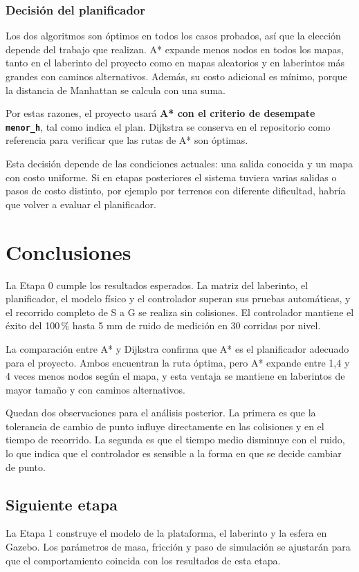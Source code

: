 \documentclass[11pt,a4paper]{article}
\begin{document}
\subsubsection*{Decisión del planificador}
Los dos algoritmos son óptimos en todos los casos probados, así que la elección depende del trabajo que realizan. A* expande menos nodos en todos los mapas, tanto en el laberinto del proyecto como en mapas aleatorios y en laberintos más grandes con caminos alternativos. Además, su costo adicional es mínimo, porque la distancia de Manhattan se calcula con una suma.

Por estas razones, el proyecto usará \textbf{A* con el criterio de desempate \texttt{menor\_h}}, tal como indica el plan. Dijkstra se conserva en el repositorio como referencia para verificar que las rutas de A* son óptimas.

Esta decisión depende de las condiciones actuales: una salida conocida y un mapa con costo uniforme. Si en etapas posteriores el sistema tuviera varias salidas o pasos de costo distinto, por ejemplo por terrenos con diferente dificultad, habría que volver a evaluar el planificador.

\section{Conclusiones}
La Etapa 0 cumple los resultados esperados. La matriz del laberinto, el planificador, el modelo físico y el controlador superan sus pruebas automáticas, y el recorrido completo de S a G se realiza sin colisiones. El controlador mantiene el éxito del 100\,\% hasta 5 mm de ruido de medición en 30 corridas por nivel.

La comparación entre A* y Dijkstra confirma que A* es el planificador adecuado para el proyecto. Ambos encuentran la ruta óptima, pero A* expande entre 1,4 y 4 veces menos nodos según el mapa, y esta ventaja se mantiene en laberintos de mayor tamaño y con caminos alternativos.

Quedan dos observaciones para el análisis posterior. La primera es que la tolerancia de cambio de punto influye directamente en las colisiones y en el tiempo de recorrido. La segunda es que el tiempo medio disminuye con el ruido, lo que indica que el controlador es sensible a la forma en que se decide cambiar de punto.

\subsection{Siguiente etapa}
La Etapa 1 construye el modelo de la plataforma, el laberinto y la esfera en Gazebo. Los parámetros de masa, fricción y paso de simulación se ajustarán para que el comportamiento coincida con los resultados de esta etapa.
\end{document}
